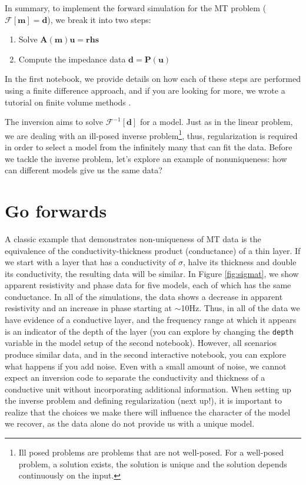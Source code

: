 \documentclass[11pt,oneside]{article}
\begin{document}
In summary, to implement the forward simulation for the MT problem ($\mathcal{F}[\mathbf{m}] = \mathbf{d}$), we break it into two steps:
\begin{enumerate}
    \item Solve $\mathbf{A}(\mathbf{m})\mathbf{u} = \mathbf{rhs}$
    \item Compute the impedance data $\mathbf{d} = \mathbf{P}(\mathbf{u})$
\end{enumerate}
In the first notebook, we provide details on how each of these steps are performed using a finite difference approach, and if you are looking for more, we wrote a tutorial on finite volume methods \citep{Cockett2016}.

The inversion aims to solve $\mathcal{F}^{-1}[\mathbf{d}]$ for a model. Just as in the linear problem, we are dealing with an ill-posed inverse problem\footnote{Ill posed problems are problems that are not well-posed. For a well-posed problem, a solution exists, the solution is unique and the solution depends continuously on the input.}, thus, regularization is required in order to select a model from the infinitely many that can fit the data. Before we tackle the inverse problem, let's explore an example of nonuniqueness: how can different models give us the same data?



\section{Go forwards}

A classic example that demonstrates non-uniqueness of MT data is the equivalence of the   conductivity-thickness product (conductance) of a thin layer. If we start with a layer that has a conductivity of $\sigma$, halve its thickness and double its conductivity, the resulting data will be similar. In Figure \ref{fig:sigmat}, we show apparent resistivity and phase data for five models, each of which has the same conductance. In all of the simulations, the data shows a decrease in apparent resistivity and an increase in phase starting at $\sim$10Hz. Thus, in all of the data we have evidence of a conductive layer, and the frequency range at which it appears is an indicator of the depth of the layer (you can explore by changing the \texttt{depth} variable in the model setup of the second notebook). However, all scenarios produce similar data, and in the second interactive notebook, you can explore what happens if you add noise. Even with a small amount of noise, we cannot expect an inversion code to separate the conductivity and thickness of a conductive unit without incorporating additional information. When setting up the inverse problem and defining regularization (next up!), it is important to realize that the choices we make there will influence the character of the model we recover, as the data alone do not provide us with a unique model.
\end{document}
